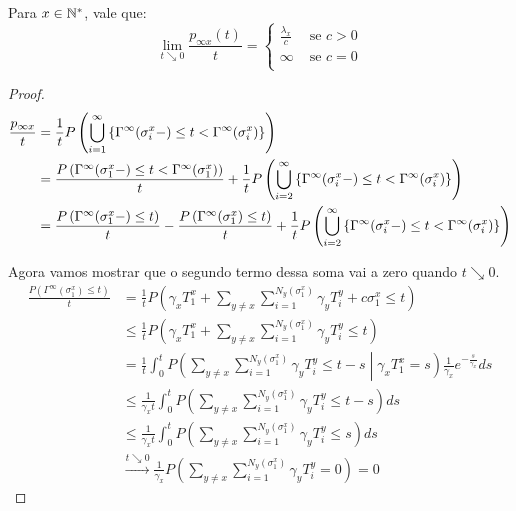 \begin{proposicao}
  Para $x \in {\mathbb{N^*}}$, vale que:
  \label{prop:taxa-inf-x}
  \begin{displaymath}
    \lim_{t \searrow 0} \frac{p_{\infty x}(t)}{t} = \begin{cases}
      \frac{\lambda_x}{c} & \textrm{ se } c > 0 \\
      \infty & \textrm{ se } c = 0 \\
    \end{cases}
  \end{displaymath}
\end{proposicao}
\begin{proof}
  \begin{align}
    \frac{p_{\infty x}}{t} &= \frac{1}{t} P \left( \bigcup_{i =
        1}^{\infty} \left\{ \Gamma^\infty (\sigma^x_i -) \leq t <
        \Gamma^\infty(\sigma^x_i) \right\} \right) \notag \\
    &= \frac{P \left( \Gamma^\infty (\sigma^x_1 -) \leq t <
      \Gamma^\infty(\sigma^x_1) \right)}{t} +
    \frac{1}{t} P \left( \bigcup_{i =
        2}^{\infty} \left\{ \Gamma^\infty (\sigma^x_i -) \leq t <
        \Gamma^\infty(\sigma^x_i) \right\} \right) \notag \notag \\
    \label{erros_taxa_inf}
    &= \frac{P \left( \Gamma^\infty (\sigma^x_1 -) \leq t \right)}{t} -
    \frac{P \left( \Gamma^\infty (\sigma^x_1) \leq t \right)}{t} +
    \frac{1}{t} P \left( \bigcup_{i =
        2}^{\infty} \left\{ \Gamma^\infty (\sigma^x_i -) \leq t <
        \Gamma^\infty(\sigma^x_i) \right\} \right)
  \end{align}

  Agora vamos mostrar que o segundo termo dessa soma vai a zero quando
  $t \searrow 0$.
  \begin{align*}
    \frac{P (\Gamma^\infty (\sigma^x_1) \leq t)}{t}
    &= \frac{1}{t} P \left(
      \gamma_x T^x_1 + 
      \sum_{y \neq x} \sum_{i = 1}^{N_y (\sigma^x_1)} \gamma_y T^y_i +
      c\sigma^x_1
      \leq t
    \right) \\
    &\leq \frac{1}{t} P \left(
      \gamma_x T^x_1 + 
      \sum_{y \neq x} \sum_{i = 1}^{N_y (\sigma^x_1)} \gamma_y T^y_i
      \leq t
    \right)\\
    &= \frac{1}{t} \int_0^t P \left(
      \sum_{y \neq x} \sum_{i = 1}^{N_y (\sigma^x_1)} \gamma_y T^y_i
      \leq t - s
      \middle\vert \gamma_x T^x_1 = s
    \right) \frac{1}{\gamma_x} e^{-\frac{s}{\gamma_x}} ds\\
    &\leq \frac{1}{\gamma_x t} \int_0^t P \left(
      \sum_{y \neq x} \sum_{i = 1}^{N_y (\sigma^x_1)} \gamma_y T^y_i
      \leq t - s
    \right) ds\\
    &\leq \frac{1}{\gamma_x t} \int_0^t P \left(
      \sum_{y \neq x} \sum_{i = 1}^{N_y (\sigma^x_1)} \gamma_y T^y_i
      \leq s
    \right) ds\\
    &\xrightarrow{t\searrow0} \frac{1}{\gamma_x} P \left(
      \sum_{y \neq x} \sum_{i = 1}^{N_y (\sigma^x_1)} \gamma_y T^y_i
      = 0 \right) = 0
  \end{align*}


\end{proof}
